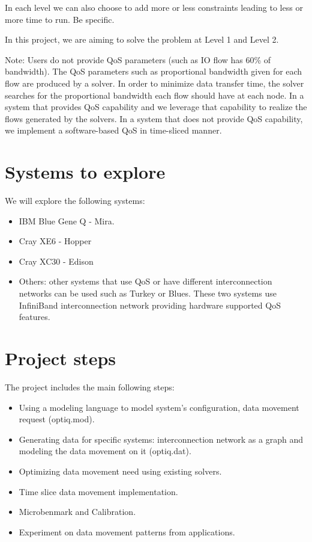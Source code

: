 \documentclass[letter]{article}
\begin{document}
In each level we can also choose to add more or less constraints leading to less or more time to run. Be specific.

In this project, we are aiming to solve the problem at Level 1 and Level 2.

Note: Users do not provide QoS parameters (such as IO flow has 60\% of bandwidth). The QoS parameters such as proportional bandwidth given for each flow are produced by a solver. In order to minimize data transfer time, the solver searches for the proportional bandwidth each flow should have at each node. In a system that provides QoS capability and we leverage that capability to realize the flows generated by the solvers. In a system that does not provide QoS capability, we implement a software-based QoS in time-sliced manner.

\section {Systems to explore}
We will explore the following systems: 
\begin{itemize}
\item IBM Blue Gene Q - Mira.
\item Cray XE6 - Hopper
\item Cray XC30 - Edison
\item Others: other systems that use QoS or have different interconnection networks can be used such as Turkey or Blues. These two systems use InfiniBand interconnection network providing hardware supported QoS features.
\end{itemize}

\section{Project steps}

The project includes the main following steps:
\begin{itemize}
\item Using a modeling language to model system's configuration, data movement request (optiq.mod).
\item Generating data for specific systems: interconnection network as a graph and modeling the data movement on it (optiq.dat).
\item Optimizing data movement need using existing solvers.
\item Time slice data movement implementation.
\item Microbenmark and Calibration.
\item Experiment on data movement patterns from applications.
\end{itemize}
\end{document}
